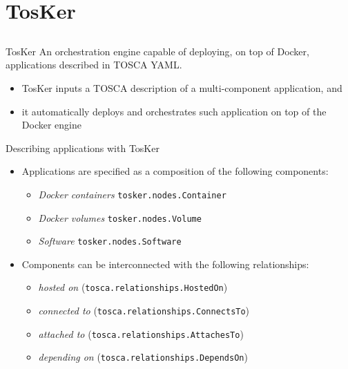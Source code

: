 \documentclass{beamer}
\begin{document}
\section{TosKer}\subsection*{}
  \begin{frame}{TosKer}
    An orchestration engine capable of deploying, on top of Docker, applications described in TOSCA YAML.

    \begin{itemize}
      \item TosKer inputs a TOSCA description of a multi-component application, and
      \item it automatically deploys and orchestrates such application on top of the Docker engine
    \end{itemize}
  \end{frame}

  \begin{frame}{Describing applications with TosKer}
    \begin{itemize}
      \item Applications are specified as a composition of the following components:\begin{itemize}
          \item \small\emph{Docker containers} {\footnotesize\texttt{tosker.nodes.Container}}
          \item \small\emph{Docker volumes} {\footnotesize\texttt{tosker.nodes.Volume}}
          \item \small\emph{Software} {\footnotesize\texttt{tosker.nodes.Software}}
        \end{itemize}\pause
      \item Components can be interconnected with the following relationships:
      \begin{itemize}
          \item \small\emph{hosted on} {(\footnotesize\texttt{tosca.relationships.HostedOn})}
          \item \small\emph{connected to} {(\footnotesize\texttt{tosca.relationships.ConnectsTo})}
          \item \small\emph{attached to} {(\footnotesize\texttt{tosca.relationships.AttachesTo})}
          \item \small\emph{depending on} {(\footnotesize\texttt{tosca.relationships.DependsOn})}
        \end{itemize}
    \end{itemize}
  \end{frame}
\end{document}
